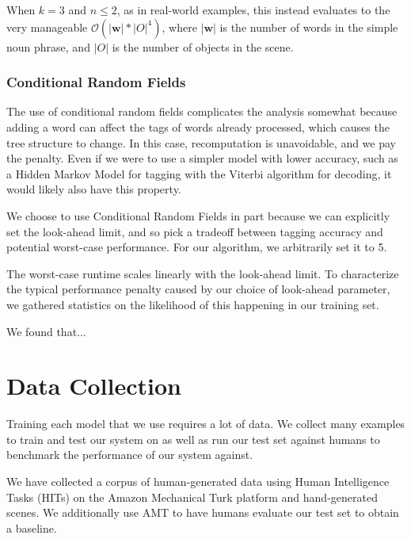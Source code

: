 \documentclass[letterpaper,10pt]{article}
\begin{document}
When $k = 3$ and $n \leq 2$, as in real-world examples, this instead evaluates to the very manageable $\mathcal{O}(|\bm w| * |O|^{4})$, where $|\bm w|$ is the number of words in the simple noun phrase, and $|O|$ is the number of objects in the scene.

\subsubsection{Conditional Random Fields}

The use of conditional random fields complicates the analysis somewhat because adding a word can affect the tags of words already processed, which causes the tree structure to change. In this case, recomputation is unavoidable, and we pay the penalty. Even if we were to use a simpler model with lower accuracy, such as a Hidden Markov Model for tagging with the Viterbi algorithm for decoding, it would likely also have this property. 

We choose to use Conditional Random Fields in part because we can explicitly set the look-ahead limit, and so pick a tradeoff between tagging accuracy and potential worst-case performance. For our algorithm, we arbitrarily set it to 5.

The worst-case runtime scales linearly with the look-ahead limit. To characterize the typical performance penalty caused by our choice of look-ahead parameter, we gathered statistics on the likelihood of this happening in our training set.

We found that...



\section{Data Collection} 

Training each model that we use requires a lot of data. We collect many examples to train and test our system on as well as run our test set against humans to benchmark the performance of our system against.

We have collected a corpus of human-generated data using Human Intelligence Tasks (HITs) on the Amazon Mechanical Turk platform and hand-generated scenes. We additionally use AMT to have humans evaluate our test set to obtain a baseline.
\end{document}
